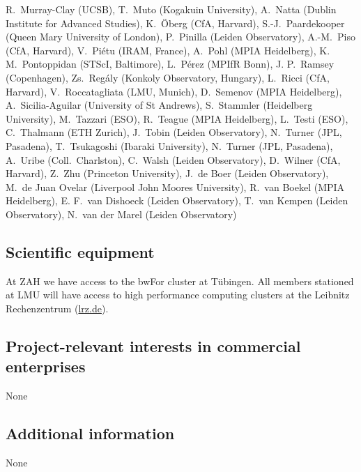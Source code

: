 \documentclass[10pt,fleqn,twoside]{article}
\begin{document}
{%
R.~Murray-Clay (UCSB),
T.~Muto (Kogakuin University),
A.~Natta (Dublin Institute for Advanced Studies),
K.~\"Oberg (CfA, Harvard),
S.-J.~Paardekooper (Queen Mary University of London),
P.~Pinilla (Leiden Observatory),
A.-M.~Piso (CfA, Harvard),
V.~Piétu (IRAM, France),
A.~Pohl (MPIA Heidelberg),
K. M.~Pontoppidan (STScI, Baltimore),
L.~Pérez (MPIfR Bonn),
J. P.~Ramsey (Copenhagen),
Zs.~Regály (Konkoly Observatory, Hungary),
L.~Ricci (CfA, Harvard),
V.~Roccatagliata (LMU, Munich),
D.~Semenov (MPIA Heidelberg),
A.~Sicilia-Aguilar (University of St Andrews),
S.~Stammler (Heidelberg University),
M.~Tazzari (ESO),
R.~Teague (MPIA Heidelberg),
L.~Testi (ESO),
C.~Thalmann (ETH Zurich),
J.~Tobin (Leiden Observatory),
N.~Turner (JPL, Pasadena),
T.~Tsukagoshi (Ibaraki University),
N.~Turner (JPL, Pasadena),
A.~Uribe (Coll.~Charlston),
C.~Walsh (Leiden Observatory),
D.~Wilner (CfA, Harvard),
Z.~Zhu (Princeton University),
J.~de Boer (Leiden Observatory),
M.~de Juan Ovelar (Liverpool John Moores University),
R.~van Boekel (MPIA Heidelberg),
E. F.~van Dishoeck (Leiden Observatory),
T.~van Kempen (Leiden Observatory),
N.~van der Marel (Leiden Observatory)
}


\subsection{Scientific equipment}

At ZAH we have access to the bwFor cluster at T\"ubingen. All members stationed
at LMU will have access to high performance computing clusters at the Leibnitz
Rechenzentrum (\url{lrz.de}).

\subsection{Project-relevant interests in commercial enterprises}

None

\subsection{Additional information}

None
\end{document}

